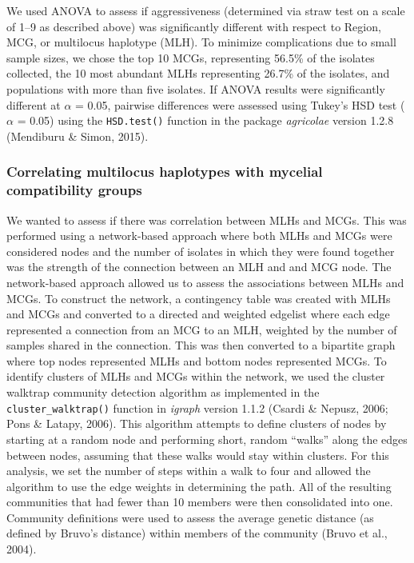 \documentclass[fleqn,10pt,lineno]{wlpeerj} %
\theoremstyle{definition}
\theoremstyle{definition}
\theoremstyle{definition}
\theoremstyle{remark}
\begin{document}
We used ANOVA to assess if aggressiveness (determined via straw test on
a scale of 1--9 as described above) was significantly different with
respect to Region, MCG, or multilocus haplotype (MLH). To minimize
complications due to small sample sizes, we chose the top 10 MCGs,
representing 56.5\% of the isolates collected, the 10 most abundant MLHs
representing 26.7\% of the isolates, and populations with more than five
isolates. If ANOVA results were significantly different at \(\alpha\) =
0.05, pairwise differences were assessed using Tukey's HSD test
(\(\alpha\) = 0.05) using the \texttt{HSD.test()} function in the
package \emph{agricolae} version 1.2.8 (Mendiburu \& Simon, 2015).

\subsubsection*{Correlating multilocus haplotypes with mycelial
compatibility
groups}\label{correlating-multilocus-haplotypes-with-mycelial-compatibility-groups}

We wanted to assess if there was correlation between MLHs and MCGs. This
was performed using a network-based approach where both MLHs and MCGs
were considered nodes and the number of isolates in which they were
found together was the strength of the connection between an MLH and and
MCG node. The network-based approach allowed us to assess the
associations between MLHs and MCGs. To construct the network, a
contingency table was created with MLHs and MCGs and converted to a
directed and weighted edgelist where each edge represented a connection
from an MCG to an MLH, weighted by the number of samples shared in the
connection. This was then converted to a bipartite graph where top nodes
represented MLHs and bottom nodes represented MCGs. To identify clusters
of MLHs and MCGs within the network, we used the cluster walktrap
community detection algorithm as implemented in the
\texttt{cluster\_walktrap()} function in \emph{igraph} version 1.1.2
(Csardi \& Nepusz, 2006; Pons \& Latapy, 2006). This algorithm attempts
to define clusters of nodes by starting at a random node and performing
short, random ``walks'' along the edges between nodes, assuming that
these walks would stay within clusters. For this analysis, we set the
number of steps within a walk to four and allowed the algorithm to use
the edge weights in determining the path. All of the resulting
communities that had fewer than 10 members were then consolidated into
one. Community definitions were used to assess the average genetic
distance (as defined by Bruvo's distance) within members of the
community (Bruvo et al., 2004).
\end{document}
